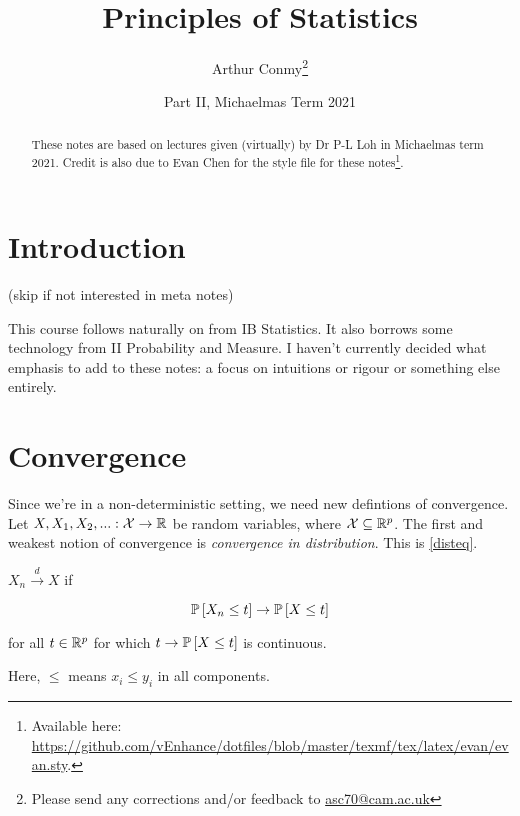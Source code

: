 \documentclass[11pt]{scrartcl}
\begin{document}
\title{Principles of Statistics}
\author{Arthur Conmy\footnote{Please send any corrections and/or feedback to \url{asc70@cam.ac.uk}}}
\date{Part II, Michaelmas Term 2021}

\maketitle
\begin{abstract}
These notes are based on lectures given (virtually) by Dr P-L Loh in Michaelmas term 2021. 
Credit is also due to Evan Chen for the style file for these notes\footnote{Available here: \url{https://github.com/vEnhance/dotfiles/blob/master/texmf/tex/latex/evan/evan.sty}.}.
\end{abstract}

\tableofcontents

\section{Introduction}

(skip if not interested in meta notes)

This course follows naturally on from IB Statistics. It also borrows some technology from II Probability and Measure. I haven't currently decided what emphasis to add to these notes: a focus on intuitions or rigour or something else entirely. 

\section{Convergence}

Since we're in a non-deterministic setting, we need new defintions of convergence. Let $X, X_1, X_2, ... : \mathcal{X} \to \RR$ be random variables, where $\mathcal{X} \subseteq \RR^p$. The first and weakest notion of convergence is \textit{convergence in distribution}. This is \ref{disteq}.

\begin{definition}
$X_n \stackrel{d}{\to} X$ if 

\begin{equation}
    \P{X_n \le t} \to \P{X \le t}
\label{disteq}
\end{equation}

for all $t \in \RR^p$ for which $t \to \P{X \le t}$ is continuous.
\end{definition}    

Here, $\le$ means $x_i \le y_i$ in all components.
\end{document}
